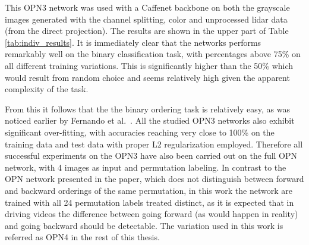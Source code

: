 This OPN3 network was used with a Caffenet backbone on both the grayscale images generated with the channel splitting, color and unprocessed lidar data (from the direct projection). The results are shown in the upper part of Table \ref{tab:indiv_results}. It is immediately clear that the networks performs remarkably well on the binary classification task, with percentages above 75\% on all different training variations. This is significantly higher than the 50\% which would result from random choice and seems relatively high given the apparent complexity of the task. 


From this it follows that the the binary ordering task is relatively easy, as was noticed earlier by Fernando et al.~\cite{fernando2017}. All the studied OPN3 networks also exhibit significant over-fitting, with accuracies reaching very close to 100\% on the training data and test data with proper L2 regularization employed. Therefore all successful experiments on the OPN3 have also been carried out on the full OPN network\cite{lee2017}, with 4 images as input and permutation labeling. In contrast to the OPN network presented in the paper, which does not distinguish between forward and backward orderings of the same permutation, in this work the network are trained with all 24 permutation labels treated distinct, as it is expected that in driving videos the difference between going forward (as would happen in reality) and going backward should be detectable. The variation used in this work is referred as OPN4 in the rest of this thesis.

